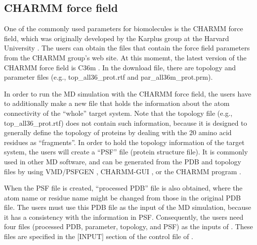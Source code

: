 \documentclass[a4paper,11pt,oneside,english]{sphinxmanual}
\begin{document}
\subsection{CHARMM force field}
\label{\detokenize{03_Input:charmm-force-field}}
One of the commonly used parameters for biomolecules is the CHARMM force field,
which was originally developed by the Karplus group at the Harvard University .
The users can obtain the files that contain the force field parameters from the CHARMM group’s web site.
At this momemt, the latest version of the CHARMM force field is C36m .
In the download file, there are topology and parameter files (e.g., top\_all36\_prot.rtf and par\_all36m\_prot.prm).

In order to run the MD simulation with the CHARMM force field, the users have to additionally make
a new file that holds the information about the atom connectivity of the “whole” target system.
Note that the topology file (e.g., top\_all36\_prot.rtf) does not contain such information,
because it is designed to generally define the topology of proteins by dealing with
the 20 amino acid residues as “fragments”. In order to hold the topology information
of the target system, the users will create a “PSF” file (protein structure file).
It is commonly used in other MD software, and can be generated from the PDB and
topology files by using VMD/PSFGEN , CHARMM-GUI , or the CHARMM program .

When the PSF file is created, “processed PDB” file is also obtained,
where the atom name or residue name might be changed from those
in the original PDB file. The users must use this PDB file as the input
of the MD simulation, because it has a consistency with the information in PSF.
Consequently, the users need four files (processed PDB, parameter, topology, and PSF)
as the inputs of . These files are specified in the {[}INPUT{]} section
of the control file of .

\end{document}
